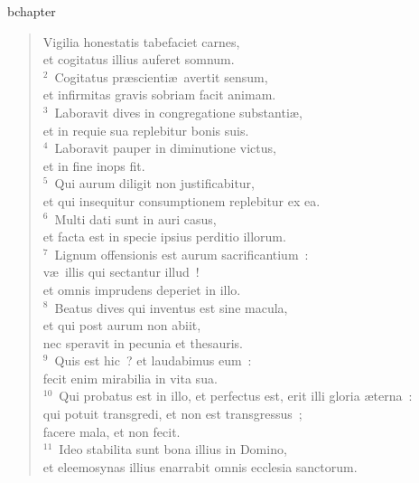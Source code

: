 bchapter\begin{verse}\vspace{-19pt}Vigilia honestatis tabefaciet carnes,\\ et cogitatus illius auferet somnum.\\
${}^{2}$~Cogitatus pr\ae scienti\ae\ avertit sensum,\\ et infirmitas gravis sobriam facit animam.\\
${}^{3}$~Laboravit dives in congregatione substanti\ae ,\\ et in requie sua replebitur bonis suis.\\
${}^{4}$~Laboravit pauper in diminutione victus,\\ et in fine inops fit.\\
${}^{5}$~Qui aurum diligit non justificabitur,\\ et qui insequitur consumptionem replebitur ex ea.\\
${}^{6}$~Multi dati sunt in auri casus,\\ et facta est in specie ipsius perditio illorum.\\
${}^{7}$~Lignum offensionis est aurum sacrificantium~:\\ v\ae\ illis qui sectantur illud~!\\ et omnis imprudens deperiet in illo.\\
${}^{8}$~Beatus dives qui inventus est sine macula,\\ et qui post aurum non abiit,\\ nec speravit in pecunia et thesauris.\\
${}^{9}$~Quis est hic~? et laudabimus eum~:\\ fecit enim mirabilia in vita sua.\\
${}^{10}$~Qui probatus est in illo, et perfectus est, erit illi gloria \ae terna~:\\ qui potuit transgredi, et non est transgressus~;\\ facere mala, et non fecit.\\
${}^{11}$~Ideo stabilita sunt bona illius in Domino,\\ et eleemosynas illius enarrabit omnis ecclesia sanctorum.\end{verse}


